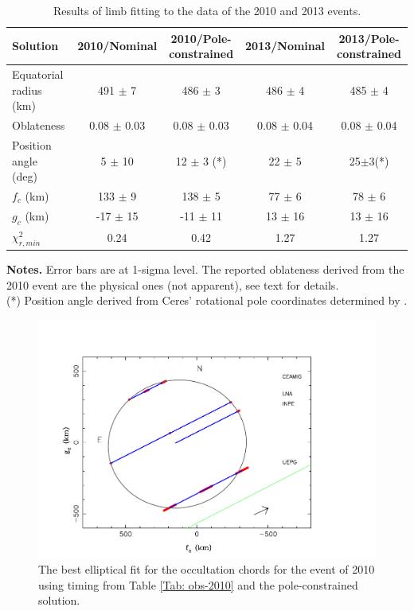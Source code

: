 \documentclass[useAMS,usenatbib]{mn2e}
\begin{document}
\begin{table}
 \centering
 \begin{minipage}{140mm}
  \caption{Results of limb fitting to the data of the 2010 and 2013 events.}
  \begin{tabular}{@{}lcccc}
  \hline
     Solution & 2010/Nominal & 2010/Pole-constrained & 2013/Nominal & 2013/Pole-constrained \\
\hline
Equatorial radius (km) & 491 $\pm$ 7   & 486 $\pm$ 3   & 486 $\pm$ 4   & 485 $\pm$ 4\\
Oblateness             & 0.08 $\pm$ 0.03 & 0.08 $\pm$ 0.03 & 0.08 $\pm$ 0.04 & 0.08 $\pm$ 0.04\\
Position angle (deg)   & 5 $\pm$ 10    & 12 $\pm$ 3 (*)& 22 $\pm$ 5    &  25$\pm$3(*)\\
$f_c$ (km)             & 133 $\pm$ 9   & 138 $\pm$ 5   & 77 $\pm$ 6    & 78 $\pm$ 6\\
$g_c$ (km)             & -17 $\pm$ 15  & -11 $\pm$ 11  & 13 $\pm$ 16   & 13 $\pm$ 16\\
$\chi^2_{r,min}$       & 0.24          &  0.42         & 1.27          & 1.27\\
\hline
\end{tabular}
\textbf{Notes.} Error bars are at 1-sigma level. The reported oblateness derived from the 2010 event are the physical ones (not apparent), see text for details. \\
(*) Position angle derived from Ceres' rotational pole coordinates determined by \cite{Drummond2014}.
\end{minipage}
\end{table}

\begin{figure}
\includegraphics[scale=0.36]{figures/Ceres_2010_body.pdf} 
\caption{The best elliptical fit for the occultation chords for the event of 2010 using timing from Table \ref{Tab: obs-2010} and the pole-constrained solution. \label{Fig:Ceres-2010-body}}
\end{figure}
\end{document}
